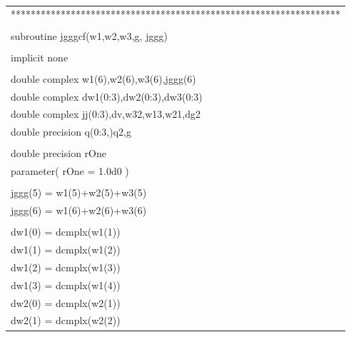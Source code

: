 \documentclass[a4paper,11pt]{article}
\begin{document}
\begin{center}
\vspace{3em}
\small
{\tt
\begin{supertabular}{l}
******************************************************************\\\\
       \hspace{0.5em} subroutine jgggcf(w1,w2,w3,g, jggg)\\
\\
       \hspace{0.5em} implicit none\\
\\
      \hspace{0.5em} double complex w1(6),w2(6),w3(6),jggg(6)\\
      \hspace{0.5em} double complex dw1(0:3),dw2(0:3),dw3(0:3)\\
      \hspace{0.5em} double complex jj(0:3),dv,w32,w13,w21,dg2\\
      \hspace{0.5em} double precision q(0:3,)q2,g\\
\\
      \hspace{0.5em} double precision rOne\\
      \hspace{0.5em} parameter( rOne = 1.0d0 )\\
\\
      \hspace{0.5em} jggg(5) = w1(5)+w2(5)+w3(5)\\
      \hspace{0.5em} jggg(6) = w1(6)+w2(6)+w3(6)\\
\\
      \hspace{0.5em} dw1(0) = dcmplx(w1(1))\\
      \hspace{0.5em} dw1(1) = dcmplx(w1(2))\\
      \hspace{0.5em} dw1(2) = dcmplx(w1(3))\\
      \hspace{0.5em} dw1(3) = dcmplx(w1(4))\\
      \hspace{0.5em} dw2(0) = dcmplx(w2(1))\\
      \hspace{0.5em} dw2(1) = dcmplx(w2(2))\\

\end{supertabular}}
\end{center}
\end{document}

